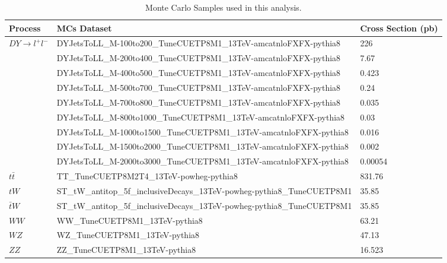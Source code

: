 \documentclass[
    10pt, %
    a4paper, %
    oneside, %
    headinclude,footinclude, %
    BCOR5mm, %
]{scrartcl}
\begin{document}
\begin{table}[H]
        \centering
        \caption{ Monte Carlo Samples used in this analysis. }
        \label{tab:mcsets}
        \begin{adjustbox}{width=1\textwidth}
            \begin{tabular}{||l l l ||} 
                \hline
                \textbf{Process} & \textbf{MCs Dataset} & \textbf{Cross Section (pb)} \\ [0.5ex] 
                \hline\hline
                $DY \rightarrow l^+ l^-$ & {\small DYJetsToLL\_M-100to200\_TuneCUETP8M1\_13TeV-amcatnloFXFX-pythia8} & 226 \\ 
                & {\small DYJetsToLL\_M-200to400\_TuneCUETP8M1\_13TeV-amcatnloFXFX-pythia8}   &   7.67   \\  
                & {\small DYJetsToLL\_M-400to500\_TuneCUETP8M1\_13TeV-amcatnloFXFX-pythia8}    &   0.423  \\
                & {\small DYJetsToLL\_M-500to700\_TuneCUETP8M1\_13TeV-amcatnloFXFX-pythia8}    &   0.24   \\ 
                & {\small DYJetsToLL\_M-700to800\_TuneCUETP8M1\_13TeV-amcatnloFXFX-pythia8}    &   0.035 \\ 
                & {\small DYJetsToLL\_M-800to1000\_TuneCUETP8M1\_13TeV-amcatnloFXFX-pythia8}   &   0.03  \\ 
                & {\small DYJetsToLL\_M-1000to1500\_TuneCUETP8M1\_13TeV-amcatnloFXFX-pythia8}  &   0.016 \\ 
                & {\small DYJetsToLL\_M-1500to2000\_TuneCUETP8M1\_13TeV-amcatnloFXFX-pythia8}  &   0.002 \\ 
                & {\small DYJetsToLL\_M-2000to3000\_TuneCUETP8M1\_13TeV-amcatnloFXFX-pythia8}  &   0.00054\\
                \hline
                $t \bar{t}$              & TT\_TuneCUETP8M2T4\_13TeV-powheg-pythia8  & 831.76\\ 
                \hline
                $tW$                     & ST\_tW\_antitop\_5f\_inclusiveDecays\_13TeV-powheg-pythia8\_TuneCUETP8M1   & 35.85\\
                $\bar{t}W$               & ST\_tW\_antitop\_5f\_inclusiveDecays\_13TeV-powheg-pythia8\_TuneCUETP8M1   & 35.85\\
                \hline
                $WW$                     & WW\_TuneCUETP8M1\_13TeV-pythia8 & 63.21 \\
                $WZ$                     & WZ\_TuneCUETP8M1\_13TeV-pythia8 & 47.13 \\
                $ZZ$                     & ZZ\_TuneCUETP8M1\_13TeV-pythia8 & 16.523 \\ [1ex]

                \hline \hline
            \end{tabular}
        \end{adjustbox}
    \end{table}
\end{document}

